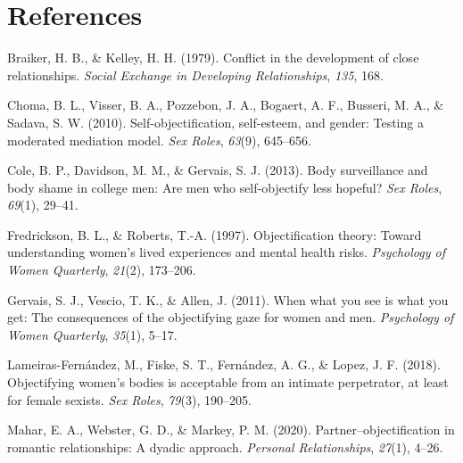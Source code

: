 \documentclass[
  man]{apa6}
\newlength{\cslhangindent}
\newlength{\cslentryspacingunit} %
\newenvironment{CSLReferences}[2] %
 {%
  \setlength{\parindent}{0pt}
  \ifodd #1
  \let\oldpar\par
  \def\par{\hangindent=\cslhangindent\oldpar}
  \fi
  \setlength{\parskip}{#2\cslentryspacingunit}
 }%
 {}
\begin{document}
\newpage

\hypertarget{references}{%
\section{References}\label{references}}

\begingroup
\setlength{\parindent}{-0.5in}
\setlength{\leftskip}{0.5in}

\hypertarget{refs}{}
\begin{CSLReferences}{1}{0}
\leavevmode{}%
Braiker, H. B., \& Kelley, H. H. (1979). Conflict in the development of close relationships. \emph{Social Exchange in Developing Relationships}, \emph{135}, 168.

\leavevmode{}%
Choma, B. L., Visser, B. A., Pozzebon, J. A., Bogaert, A. F., Busseri, M. A., \& Sadava, S. W. (2010). Self-objectification, self-esteem, and gender: Testing a moderated mediation model. \emph{Sex Roles}, \emph{63}(9), 645--656.

\leavevmode{}%
Cole, B. P., Davidson, M. M., \& Gervais, S. J. (2013). Body surveillance and body shame in college men: Are men who self-objectify less hopeful? \emph{Sex Roles}, \emph{69}(1), 29--41.

\leavevmode{}%
Fredrickson, B. L., \& Roberts, T.-A. (1997). Objectification theory: Toward understanding women's lived experiences and mental health risks. \emph{Psychology of Women Quarterly}, \emph{21}(2), 173--206.

\leavevmode{}%
Gervais, S. J., Vescio, T. K., \& Allen, J. (2011). When what you see is what you get: The consequences of the objectifying gaze for women and men. \emph{Psychology of Women Quarterly}, \emph{35}(1), 5--17.

\leavevmode{}%
Lameiras-Fernández, M., Fiske, S. T., Fernández, A. G., \& Lopez, J. F. (2018). Objectifying women's bodies is acceptable from an intimate perpetrator, at least for female sexists. \emph{Sex Roles}, \emph{79}(3), 190--205.

\leavevmode{}%
Mahar, E. A., Webster, G. D., \& Markey, P. M. (2020). Partner--objectification in romantic relationships: A dyadic approach. \emph{Personal Relationships}, \emph{27}(1), 4--26.


\end{CSLReferences}
\end{document}
